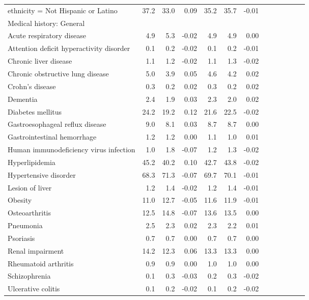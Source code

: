 \documentclass[11pt,]{article}
\begin{document}
\begin{longtable}{lrrrrrrrrrrrr}
      ethnicity = Not Hispanic or Latino & 37.2 & 33.0 &  0.09 & 35.2 & 35.7 & -0.01 \\ 
  Medical history: General &    &    &     &    &    &     \\ 
      Acute respiratory disease &  4.9 &  5.3 & -0.02 &  4.9 &  4.9 &  0.00 \\ 
      Attention deficit hyperactivity disorder &  0.1 &  0.2 & -0.02 &  0.1 &  0.2 & -0.01 \\ 
      Chronic liver disease &  1.1 &  1.2 & -0.02 &  1.1 &  1.3 & -0.02 \\ 
      Chronic obstructive lung disease &  5.0 &  3.9 &  0.05 &  4.6 &  4.2 &  0.02 \\ 
      Crohn's disease &  0.3 &  0.2 &  0.02 &  0.3 &  0.2 &  0.02 \\ 
      Dementia &  2.4 &  1.9 &  0.03 &  2.3 &  2.0 &  0.02 \\ 
      Diabetes mellitus & 24.2 & 19.2 &  0.12 & 21.6 & 22.5 & -0.02 \\ 
      Gastroesophageal reflux disease &  9.0 &  8.1 &  0.03 &  8.7 &  8.7 &  0.00 \\ 
      Gastrointestinal hemorrhage &  1.2 &  1.2 &  0.00 &  1.1 &  1.0 &  0.01 \\ 
      Human immunodeficiency virus infection &  1.0 &  1.8 & -0.07 &  1.2 &  1.3 & -0.02 \\ 
      Hyperlipidemia & 45.2 & 40.2 &  0.10 & 42.7 & 43.8 & -0.02 \\ 
      Hypertensive disorder & 68.3 & 71.3 & -0.07 & 69.7 & 70.1 & -0.01 \\ 
      Lesion of liver &  1.2 &  1.4 & -0.02 &  1.2 &  1.4 & -0.01 \\ 
      Obesity & 11.0 & 12.7 & -0.05 & 11.6 & 11.9 & -0.01 \\ 
      Osteoarthritis & 12.5 & 14.8 & -0.07 & 13.6 & 13.5 &  0.00 \\ 
      Pneumonia &  2.5 &  2.3 &  0.02 &  2.3 &  2.2 &  0.01 \\ 
      Psoriasis &  0.7 &  0.7 &  0.00 &  0.7 &  0.7 &  0.00 \\ 
      Renal impairment & 14.2 & 12.3 &  0.06 & 13.3 & 13.3 &  0.00 \\ 
      Rheumatoid arthritis &  0.9 &  0.9 &  0.00 &  1.0 &  1.0 &  0.00 \\ 
      Schizophrenia &  0.1 &  0.3 & -0.03 &  0.2 &  0.3 & -0.02 \\ 
      Ulcerative colitis &  0.1 &  0.2 & -0.02 &  0.1 &  0.2 & -0.02 \\ 

\end{longtable}
\end{document}
